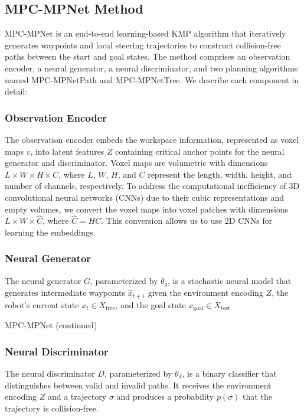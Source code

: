 \subsection{MPC-MPNet Method}

MPC-MPNet is an end-to-end learning-based KMP algorithm that iteratively generates waypoints and local steering trajectories to construct collision-free paths between the start and goal states. The method comprises an observation encoder, a neural generator, a neural discriminator, and two planning algorithms named MPC-MPNetPath and MPC-MPNetTree. We describe each component in detail:

\subsubsection{Observation Encoder}

The observation encoder embeds the workspace information, represented as voxel maps $v$, into latent features $Z$ containing critical anchor points for the neural generator and discriminator. Voxel maps are volumetric with dimensions $L \times W \times H \times C$, where $L$, $W$, $H$, and $C$ represent the length, width, height, and number of channels, respectively. To address the computational inefficiency of 3D convolutional neural networks (CNNs) due to their cubic representations and empty volumes, we convert the voxel maps into voxel patches with dimensions $L \times W \times \hat{C}$, where $\hat{C} = HC$. This conversion allows us to use 2D CNNs for learning the embeddings.

\subsubsection{Neural Generator}

The neural generator $G$, parameterized by $\theta_g$, is a stochastic neural model that generates intermediate waypoints $\hat{x}_{t+1}$ given the environment encoding $Z$, the robot's current state $x_t \in X_{\text{free}}$, and the goal state $x_{\text{goal}} \in X_{\text{test}}$

{MPC-MPNet (continued)}

\subsubsection{Neural Discriminator}

The neural discriminator $D$, parameterized by $\theta_d$, is a binary classifier that distinguishes between valid and invalid paths. It receives the environment encoding $Z$ and a trajectory $\sigma$ and produces a probability $p(\sigma)$ that the trajectory is collision-free. 

